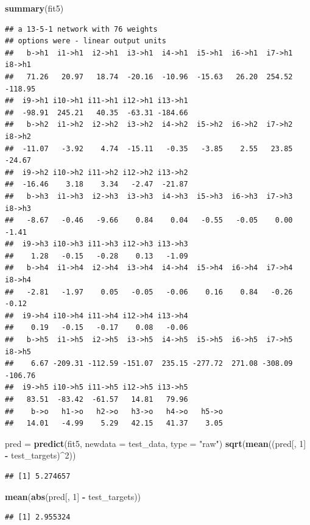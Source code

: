 \documentclass[10pt,ignorenonframetext,]{beamer}
\newenvironment{Shaded}{\begin{snugshade}}{\end{snugshade}}
\newcommand{\DataTypeTok}[1]{\textcolor[rgb]{0.13,0.29,0.53}{#1}}
\newcommand{\DecValTok}[1]{\textcolor[rgb]{0.00,0.00,0.81}{#1}}
\newcommand{\KeywordTok}[1]{\textcolor[rgb]{0.13,0.29,0.53}{\textbf{#1}}}
\newcommand{\NormalTok}[1]{#1}
\newcommand{\OperatorTok}[1]{\textcolor[rgb]{0.81,0.36,0.00}{\textbf{#1}}}
\newcommand{\StringTok}[1]{\textcolor[rgb]{0.31,0.60,0.02}{#1}}
\begin{document}
\begin{frame}[fragile]
\begin{Shaded}
\begin{Highlighting}[]
\KeywordTok{summary}\NormalTok{(fit5)}
\end{Highlighting}
\end{Shaded}

\begin{verbatim}
## a 13-5-1 network with 76 weights
## options were - linear output units 
##   b->h1  i1->h1  i2->h1  i3->h1  i4->h1  i5->h1  i6->h1  i7->h1  i8->h1 
##   71.26   20.97   18.74  -20.16  -10.96  -15.63   26.20  254.52 -118.95 
##  i9->h1 i10->h1 i11->h1 i12->h1 i13->h1 
##  -98.91  245.21   40.35  -63.31 -184.66 
##   b->h2  i1->h2  i2->h2  i3->h2  i4->h2  i5->h2  i6->h2  i7->h2  i8->h2 
##  -11.07   -3.92    4.74  -15.11   -0.35   -3.85    2.55   23.85  -24.67 
##  i9->h2 i10->h2 i11->h2 i12->h2 i13->h2 
##  -16.46    3.18    3.34   -2.47  -21.87 
##   b->h3  i1->h3  i2->h3  i3->h3  i4->h3  i5->h3  i6->h3  i7->h3  i8->h3 
##   -8.67   -0.46   -9.66    0.84    0.04   -0.55   -0.05    0.00   -1.41 
##  i9->h3 i10->h3 i11->h3 i12->h3 i13->h3 
##    1.28   -0.15   -0.28    0.13   -1.09 
##   b->h4  i1->h4  i2->h4  i3->h4  i4->h4  i5->h4  i6->h4  i7->h4  i8->h4 
##   -2.81   -1.97    0.05   -0.05   -0.06    0.16    0.84   -0.26   -0.12 
##  i9->h4 i10->h4 i11->h4 i12->h4 i13->h4 
##    0.19   -0.15   -0.17    0.08   -0.06 
##   b->h5  i1->h5  i2->h5  i3->h5  i4->h5  i5->h5  i6->h5  i7->h5  i8->h5 
##    6.67 -209.31 -112.59 -151.07  235.15 -277.72  271.08 -308.09 -106.76 
##  i9->h5 i10->h5 i11->h5 i12->h5 i13->h5 
##   83.51  -83.42  -61.57   14.81   79.96 
##    b->o   h1->o   h2->o   h3->o   h4->o   h5->o 
##   14.01   -4.99    5.29   42.15   41.37    3.05
\end{verbatim}

\begin{Shaded}
\begin{Highlighting}[]
\NormalTok{pred =}\StringTok{ }\KeywordTok{predict}\NormalTok{(fit5, }\DataTypeTok{newdata =}\NormalTok{ test_data, }\DataTypeTok{type =} \StringTok{"raw"}\NormalTok{)}
\KeywordTok{sqrt}\NormalTok{(}\KeywordTok{mean}\NormalTok{((pred[, }\DecValTok{1}\NormalTok{] }\OperatorTok{-}\StringTok{ }\NormalTok{test_targets)}\OperatorTok{^}\DecValTok{2}\NormalTok{))}
\end{Highlighting}
\end{Shaded}

\begin{verbatim}
## [1] 5.274657
\end{verbatim}

\begin{Shaded}
\begin{Highlighting}[]
\KeywordTok{mean}\NormalTok{(}\KeywordTok{abs}\NormalTok{(pred[, }\DecValTok{1}\NormalTok{] }\OperatorTok{-}\StringTok{ }\NormalTok{test_targets))}
\end{Highlighting}
\end{Shaded}

\begin{verbatim}
## [1] 2.955324
\end{verbatim}

\end{frame}
\end{document}
